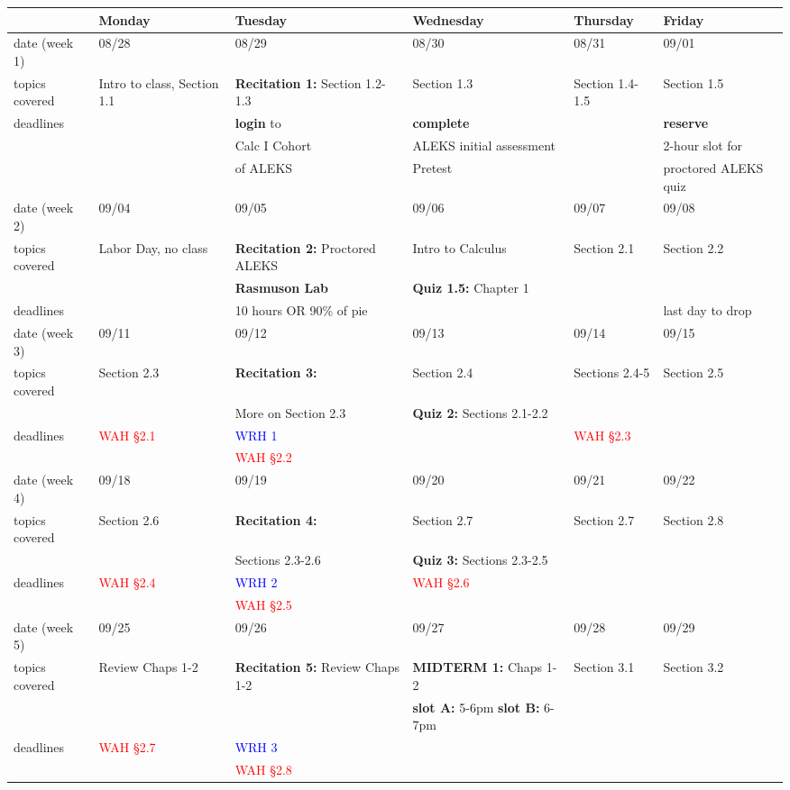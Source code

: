 \documentclass[11pt,fleqn]{article}
\begin{document}
\begin{tabularx}{\textwidth}{|X|| X | X | X | X | X |}
\hline
&Monday & Tuesday & Wednesday & Thursday & Friday \\
\hline \hline
\rowcolor{gray!20} 
date (week 1)&08/28&08/29&08/30&08/31&09/01\\
\hline
topics covered&Intro to class, Section 1.1& \textbf{Recitation 1:} Section 1.2-1.3&  Section 1.3& Section 1.4-1.5&Section 1.5\\
\hline
deadlines&&\textbf{login} to &\textbf{complete}&&\textbf{reserve}\\
&&Calc I Cohort &ALEKS initial assessment&&2-hour slot for\\
&&of ALEKS&Pretest&&proctored ALEKS quiz\\
\hline \hline
\rowcolor{gray!20}
date (week 2)&09/04&09/05&09/06&09/07&09/08\\ \hline
topics covered &Labor Day, no class&\textbf{Recitation 2:} Proctored ALEKS& Intro to Calculus &Section 2.1&Section 2.2\\ 
&&\textbf{\textcolor{ddgreen}{Rasmuson Lab}}&\textbf{Quiz 1.5:} Chapter 1&&\\ \hline
deadlines&&10 hours OR 90\% of pie&&&\textcolor{ddgreen}{last day to drop}\\ 
 \hline \hline
\rowcolor{gray!20}
date (week 3)&09/11&09/12&09/13&09/14&09/15\\ \hline
topics covered&Section 2.3&\textbf{Recitation 3:} &Section 2.4 &Sections 2.4-5&Section 2.5\\
&&More on Section 2.3&\textbf{Quiz 2:} Sections 2.1-2.2&&\\ \hline
deadlines&\textcolor{red}{WAH \S 2.1} & \textcolor{blue}{WRH 1} &&\textcolor{red}{WAH \S 2.3} \\
&&\textcolor{red}{WAH \S 2.2} &&&\\ \hline \hline
\rowcolor{gray!20}
date (week 4)&09/18&09/19&09/20&09/21&09/22\\ \hline
topics covered&Section 2.6&\textbf{Recitation 4:}&Section 2.7&Section 2.7&Section 2.8\\ 
&&Sections 2.3-2.6&\textbf{Quiz 3:} Sections 2.3-2.5&& \\ \hline
deadlines&\textcolor{red}{WAH \S 2.4}& \textcolor{blue}{WRH 2} &\textcolor{red}{WAH \S 2.6}&& \\ 
&&\textcolor{red}{WAH \S 2.5}&&&\\ \hline \hline
\rowcolor{gray!20}
date (week 5)&09/25&09/26&09/27&09/28&09/29\\ \hline
topics covered&Review Chaps 1-2&\textbf{Recitation 5:} Review Chaps 1-2&\textcolor{dcyan}{\textbf{MIDTERM 1: }} Chaps 1-2&Section 3.1&Section 3.2\\
&&&\textcolor{ddgreen}{\textbf{slot A:} 5-6pm  \textbf{slot B:} 6-7pm}&&\\ \hline
deadlines&\textcolor{red}{WAH \S 2.7}& \textcolor{blue}{WRH 3} &&& \\ 
&&\textcolor{red}{WAH \S 2.8}&&&\\ \hline \hline
\end{tabularx}
\end{document}
